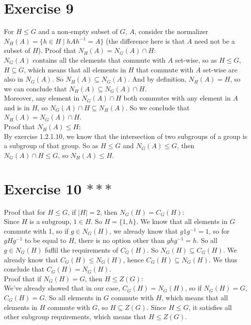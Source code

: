 \documentclass[12pt]{article}
\begin{document}
    \section*{Exercise 9}
    For $H \leqslant G$ and a non-empty subset of $G$, $A$,
    consider the normalizer $N_H(A) = \{ h \in H \mid hAh^{-1} = A \}$
    (the difference here is that $A$ need not be a subset of $H$).
    Proof that $N_H(A) = N_G(A) \cap H$: \\
    $N_G(A)$ contains all the elements that commute with $A$ set-wise,
    so as $H \leqslant G$, $H \subseteq G$,
    which means that all elements in $H$ that commute with $A$ set-wise
    are also in $N_G(A)$.
    So $N_H(A) \subseteq N_G(A)$.
    And by definition, $N_H(A) = H$,
    so we can conclude that $N_H(A) \subseteq N_G(A) \cap H$. \\
    Moreover, any element in $N_G(A) \cap H$ both commutes with any element
    in $A$ and is in $H$, so $N_G(A) \cap H \subseteq N_H(A)$.
    So we conclude that $N_H(A) = N_G(A) \cap H$. \\
    Proof that $N_H(A) \leqslant H$: \\
    By exercise 1.2.1.10, we know that the intersection of two
    subgroups of a group is a subgroup of that group.
    So as $H \leqslant G$ and $N_G(A) \leqslant G$,
    then $N_G(A) \cap H \leqslant G$,
    so $N_H(A) \leqslant H$.


    \section*{Exercise 10 $***$}
    Proof that for $H \leqslant G$, if $|H| = 2$, then $N_G(H) = C_G(H)$: \\
    Since $H$ is a subgroup, $1 \in H$.
    So $H = \{1, h\}$.
    We know that all elements in $G$ commute with 1,
    so if $g \in N_G(H)$, we already know that $g1g^{-1} = 1$,
    so for $gHg^{-1}$ to be equal to $H$,
    there is no option other than $ghg^{-1} = h$.
    So all $g \in N_G(H)$ fuffil the requirements of $C_G(H)$.
    So $N_G(H) \subseteq C_G(H)$.
    We already know that $C_G(H) \leqslant N_G(H)$,
    hence $C_G(H) \subseteq N_G(H)$.
    We thus conclude that $C_G(H) = N_G(H)$. \\
    Proof that if $N_G(H) = G$, then $H \leqslant Z(G)$: \\
    We've already showed that in our case, $C_G(H) = N_G(H)$,
    so if $N_G(H) = G$, $C_G(H) = G$.
    So all elements in $G$ commute with $H$,
    which means that all elements in $H$ commute with $G$,
    so $H \subseteq Z(G)$.
    Since $H \leqslant G$, it satisfies all other subgroup requirements,
    which means that $H \leqslant Z(G)$.
\end{document}
